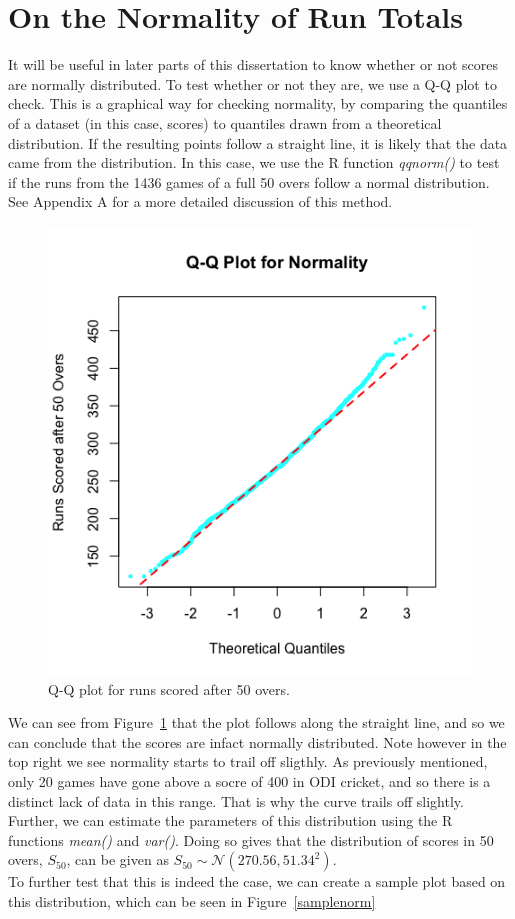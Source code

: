 \section{On the Normality of Run Totals}
It will be useful in later parts of this dissertation to know whether or not scores are normally distributed. To test whether or not 
they are, we use a Q-Q plot to check. This is a graphical way for checking normality, by comparing the quantiles of a dataset (in this case, scores) to quantiles
drawn from a theoretical distribution. If the resulting points follow a straight line, it is likely that the data came from the distribution.
In this case, we use the R function \textit{qqnorm()} to test if the runs from the 1436 games of a full 50 overs follow a normal distribution. See Appendix A for 
a more detailed discussion of this method. \\

\begin{figure}[h]
    \centering
    \includegraphics[width=0.4\linewidth]{figures/qqnormplot.png}
    \caption{Q-Q plot for runs scored after 50 overs.}
    \label{qqplot50}
\end{figure}

We can see from Figure~\ref{qqplot50} that the plot follows along the straight line, and so we can conclude that the scores are infact normally distributed. Note however 
in the top right we see normality starts to trail off sligthly. As previously mentioned, only 20 games have gone above a socre of 400 in ODI cricket, and so 
there is a distinct lack of data in this range. That is why the curve trails off slightly. 
Further, we can estimate the parameters of this distribution using the R functions \textit{mean()} and \textit{var()}. Doing so gives that the distribution
of scores in 50 overs, $S_{50}$, can be given as $S_{50} \sim \mathcal{N}(270.56,51.34^2)$. \\ 

To further test that this is indeed the case, we can create a sample plot based on this distribution, which can be seen in Figure~\ref{samplenorm}

